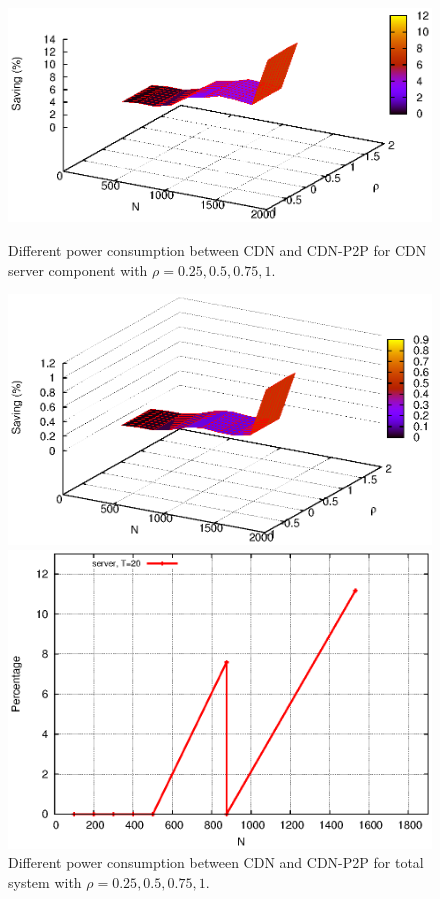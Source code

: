 \documentclass[JIP]{ipsj}
\begin{document}
\begin{figure}[t]
\centering
\begin{minipage}[b]{0.4\linewidth}
	\includegraphics[scale=0.5]{graphs/diff3dimension.eps}
	\caption{Different power consumption between CDN and CDN-P2P for CDN server component with $\rho=0.25,0.5,0.75,1$.}
	\label{fig:diff1}
\end{minipage}
\hfill
\begin{minipage}[b]{0.4\linewidth}
	\includegraphics[scale=0.5]{graphs/diff3dimension2.eps}
	\caption{Different power consumption between CDN and CDN-P2P for total system with $\rho=0.25,0.5,0.75,1$.}
	\label{fig:diff2}
\end{minipage}
\centering
\begin{minipage}[b]{0.4\linewidth}
	\includegraphics[scale=0.5]{graphs/diff-3.eps}

\end{minipage}
\end{figure}
\end{document}
